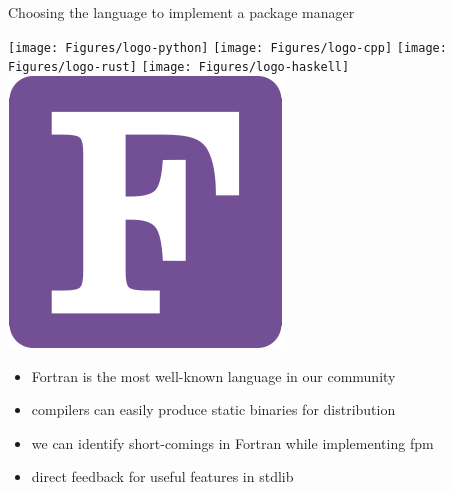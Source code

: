\documentclass[lualatex,10pt,aspectratio=169]{beamer}
\begin{document}
\begin{frame}{Choosing the language to implement a package manager}
   \medskip

   \begin{center}
      \texttt{[image: Figures/logo-python]}
      \quad
      \texttt{[image: Figures/logo-cpp]}
      \quad
      \texttt{[image: Figures/logo-rust]}
      \quad
      \texttt{[image: Figures/logo-haskell]}
      \quad
      \includegraphics[height=.5in]{Figures/logo-fortran}
   \end{center}
   \medskip

   \begin{itemize}
      \item \alert{Fortran} is the most well-known language in our community
      \item compilers can easily produce \alert{static binaries} for distribution
      \item we can identify short-comings in Fortran while implementing fpm
      \item direct feedback for useful features in \alert{stdlib}
   \end{itemize}
\end{frame}
\end{document}
